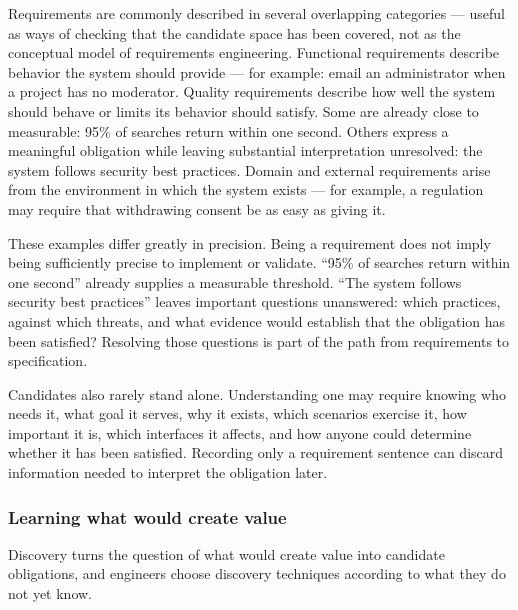 Requirements are commonly described in several overlapping categories --- useful as ways of checking
that the candidate space has been covered, not as the conceptual model of requirements engineering.
Functional requirements describe behavior the system should provide --- for example: email an
administrator when a project has no moderator. Quality requirements describe how well the system
should behave or limits its behavior should satisfy. Some are already close to measurable: 95\% of
searches return within one second. Others express a meaningful obligation while leaving substantial
interpretation unresolved: the system follows security best practices. Domain and external
requirements arise from the environment in which the system exists --- for example, a regulation may
require that withdrawing consent be as easy as giving it.

These examples differ greatly in precision. Being a requirement does not imply being sufficiently
precise to implement or validate. ``95\% of searches return within one second'' already supplies a
measurable threshold. ``The system follows security best practices'' leaves important questions
unanswered: which practices, against which threats, and what evidence would establish that the
obligation has been satisfied? Resolving those questions is part of the path from requirements to
specification.

Candidates also rarely stand alone. Understanding one may require knowing who needs it, what goal
it serves, why it exists, which scenarios exercise it, how important it is, which interfaces it
affects, and how anyone could determine whether it has been satisfied. Recording only a requirement
sentence can discard information needed to interpret the obligation later.

\subsubsection{Learning what would create value}\label{sec-discovering}

Discovery turns the question of what would create value into candidate obligations, and engineers
choose discovery techniques according to what they do not yet know.

